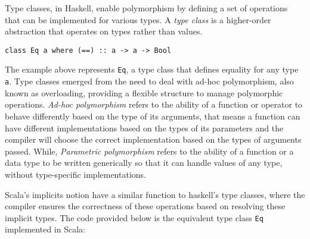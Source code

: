 Type classes, in Haskell, enable polymorphism by defining a set of operations that can be implemented for various types. A \textit{type class} is a higher-order abstraction that operates on types rather than values.

\lstinline{class Eq a where (==) :: a -> a -> Bool}

The example above represents \lstinline{Eq}, a type class that defines equality for any type \lstinline{a}. Type classes emerged from the need to deal with ad-hoc polymorphism, also known as overloading, providing a flexible structure to manage polymorphic operations. 
\textit{Ad-hoc polymorphism} refers to the ability of a function or operator to behave differently based on the type of its arguments, that means a function can have different implementations based on the types of its parameters and the compiler will choose the correct implementation based on the types of arguments passed.
 While, \textit{Parametric polymorphism} refers to the ability of a function or a data type to be written generically so that it can handle values of any type, without type-specific implementations.


Scala’s implicits notion have a similar function to haskell's type classes, where the compiler ensures the correctness of these operations based on resolving these implicit types. The code provided below is the equivalent type class \lstinline{Eq} implemented in Scala: 




\LIMPA
